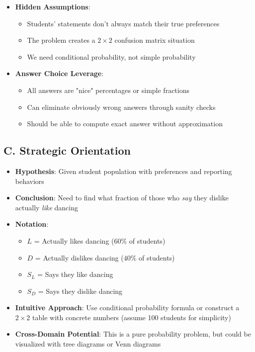 \documentclass[]{article}
\begin{document}
\begin{problemconfigbox}
\begin{itemize}[leftmargin=*]
    \item \textbf{Hidden Assumptions}:
    \begin{itemize}
        \item Students' statements don't always match their true preferences
        \item The problem creates a $2 \times 2$ confusion matrix situation
        \item We need conditional probability, not simple probability
    \end{itemize}
    
    \item \textbf{Answer Choice Leverage}:
    \begin{itemize}
        \item All answers are "nice" percentages or simple fractions
        \item Can eliminate obviously wrong answers through sanity checks
        \item Should be able to compute exact answer without approximation
    \end{itemize}
\end{itemize}

\subsection*{C. Strategic Orientation}
\begin{itemize}[leftmargin=*]
    \item \textbf{Hypothesis}: Given student population with preferences and reporting behaviors
    
    \item \textbf{Conclusion}: Need to find what fraction of those who \textit{say} they dislike actually \textit{like} dancing
    
    \item \textbf{Notation}:
    \begin{itemize}
        \item $L$ = Actually likes dancing ($60\%$ of students)
        \item $D$ = Actually dislikes dancing ($40\%$ of students)
        \item $S_L$ = Says they like dancing
        \item $S_D$ = Says they dislike dancing
    \end{itemize}
    
    \item \textbf{Intuitive Approach}: Use conditional probability formula or construct a $2 \times 2$ table with concrete numbers (assume 100 students for simplicity)
    
    \item \textbf{Cross-Domain Potential}: This is a pure probability problem, but could be visualized with tree diagrams or Venn diagrams
\end{itemize}
\end{problemconfigbox}
\end{document}
